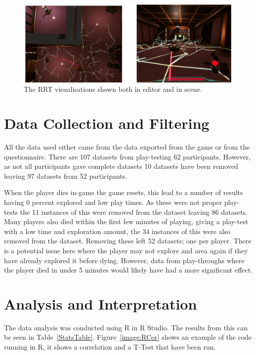 \documentclass[journal]{IEEEtran}
\begin{document}
	
	\begin{figure}[h]
		\includegraphics[width=1.0\linewidth]{RRTVis.png}
		\caption{The RRT visualisations shown both in editor and in scene.}
		\label{image:RRTVisuals}
	\end{figure}  
	
	\section{Data Collection and Filtering}  \label{datacollection}
	All the data used either came from the data exported from the game or from the questionnaire.  There are 107 datasets from play-testing 62 participants. However, as not all participants gave complete datasets 10 datasets have been removed leaving 97 datasets from 52 participants. 
	
	When the player dies in-game the game resets, this lead to a number of results having 0 percent explored and low play times. As these were not proper play-tests the 11 instances of this were removed from the dataset leaving 86 datasets. Many players also died within the first few minutes of playing, giving a play-test with a low time and exploration amount, the 34 instances of this were also removed from the dataset. Removing these left 52 datasets; one per player. There is a potential issue here where the player may not explore and area again if they have already explored it before dying. However, data from play-throughs where the player died in under 5 minutes would likely have had a more significant effect. 
	
	\section{Analysis and Interpretation} \label{Analysis}
	The data analysis was conducted using R in R Studio. The results from this can be seen in Table~\ref{StatsTable}.  Figure~\ref{image:RCor} shows an example of the code running in R, it shows a correlation and a T-Test that have been run. 
	
\end{document}
